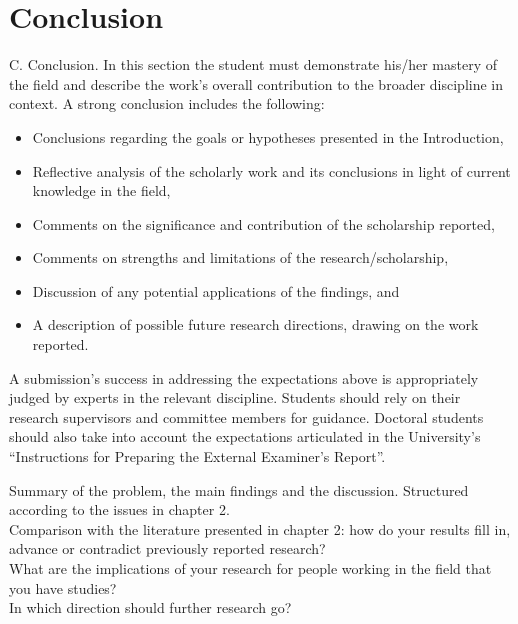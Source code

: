 \chapter{Conclusion}
  C. Conclusion. In this section the student must demonstrate his/her mastery of the field and 
    describe the work's overall contribution to the broader discipline in context. A strong 
    conclusion includes the following:
    \begin{itemize}
      \item Conclusions regarding the goals or hypotheses presented in the Introduction,
      \item Reflective analysis of the scholarly work and its conclusions in light of current 
        knowledge in the field,
      \item Comments on the significance and contribution of the scholarship reported,
      \item Comments on strengths and limitations of the research/scholarship,
      \item Discussion of any potential applications of the findings, and
      \item A description of possible future research directions, drawing on the work reported.
    \end{itemize}
    A submission's success in addressing the expectations above is appropriately judged by experts 
      in the relevant discipline. Students should rely on their research supervisors and committee 
      members for guidance. Doctoral students should also take into account the expectations 
      articulated in the University's “Instructions for Preparing the External Examiner's Report”.

  Summary of the problem, the main findings and the discussion. Structured according to the issues 
    in chapter 2. \\
  Comparison with the literature presented in chapter 2: how do your results fill in, advance or 
    contradict previously reported research? \\
  What are the implications of your research for people working in the field that you have studies? \\
  In which direction should further research go?  \\

